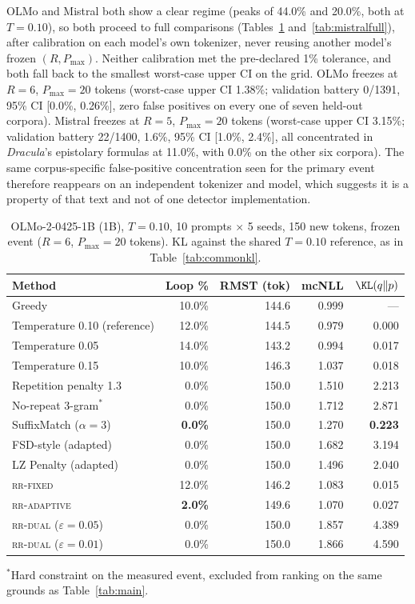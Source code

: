 OLMo and Mistral both show a clear regime (peaks of 44.0\% and 20.0\%, both at $T{=}0.10$), so both proceed to full comparisons (Tables~\ref{tab:olmofull} and~\ref{tab:mistralfull}), after calibration on each model's own tokenizer, never reusing another model's frozen $(R,P_{\max})$. Neither calibration met the pre-declared 1\% tolerance, and both fall back to the smallest worst-case upper CI on the grid. OLMo freezes at $R{=}6$, $P_{\max}{=}20$ tokens (worst-case upper CI 1.38\%; validation battery 0/1391, 95\% CI [0.0\%, 0.26\%], zero false positives on every one of seven held-out corpora). Mistral freezes at $R{=}5$, $P_{\max}{=}20$ tokens (worst-case upper CI 3.15\%; validation battery 22/1400, 1.6\%, 95\% CI [1.0\%, 2.4\%], all concentrated in \emph{Dracula}'s epistolary formulas at 11.0\%, with 0.0\% on the other six corpora). The same corpus-specific false-positive concentration seen for the primary event therefore reappears on an independent tokenizer and model, which suggests it is a property of that text and not of one detector implementation.

\begin{table}[ht]
\centering
\caption{OLMo-2-0425-1B (1B), $T{=}0.10$, 10 prompts $\times$ 5 seeds, 150 new tokens, frozen event ($R{=}6$, $P_{\max}{=}20$ tokens). KL against the shared $T{=}0.10$ reference, as in Table~\ref{tab:commonkl}.}
\label{tab:olmofull}
\begin{tabular}{@{}lrrrr@{}}
\toprule
Method & Loop \% & RMST (tok) & mcNLL & $\KL(q\Vert p)$ \\
\midrule
Greedy                      & 10.0\% & 144.6 & 0.999 & --- \\
Temperature 0.10 (reference) & 12.0\% & 144.5 & 0.979 & 0.000 \\
Temperature 0.05             & 14.0\% & 143.2 & 0.994 & 0.017 \\
Temperature 0.15             & 10.0\% & 146.3 & 1.037 & 0.018 \\
Repetition penalty 1.3        & 0.0\%  & 150.0 & 1.510 & 2.213 \\
No-repeat 3-gram$^{*}$       & 0.0\%  & 150.0 & 1.712 & 2.871 \\
SuffixMatch ($\alpha{=}3$)    & \textbf{0.0\%}  & 150.0 & 1.270 & \textbf{0.223} \\
FSD-style (adapted)          & 0.0\%  & 150.0 & 1.682 & 3.194 \\
LZ Penalty (adapted)        & 0.0\%  & 150.0 & 1.496 & 2.040 \\
\textsc{rr-fixed}             & 12.0\% & 146.2 & 1.083 & 0.015 \\
\textsc{rr-adaptive}          & \textbf{2.0\%}  & 149.6 & 1.070 & 0.027 \\
\textsc{rr-dual} ($\varepsilon{=}0.05$) & 0.0\% & 150.0 & 1.857 & 4.389 \\
\textsc{rr-dual} ($\varepsilon{=}0.01$) & 0.0\% & 150.0 & 1.866 & 4.590 \\
\bottomrule
\end{tabular}

\vspace{4pt}
{\footnotesize $^{*}$Hard constraint on the measured event, excluded from ranking on the same grounds as Table~\ref{tab:main}.}
\end{table}

